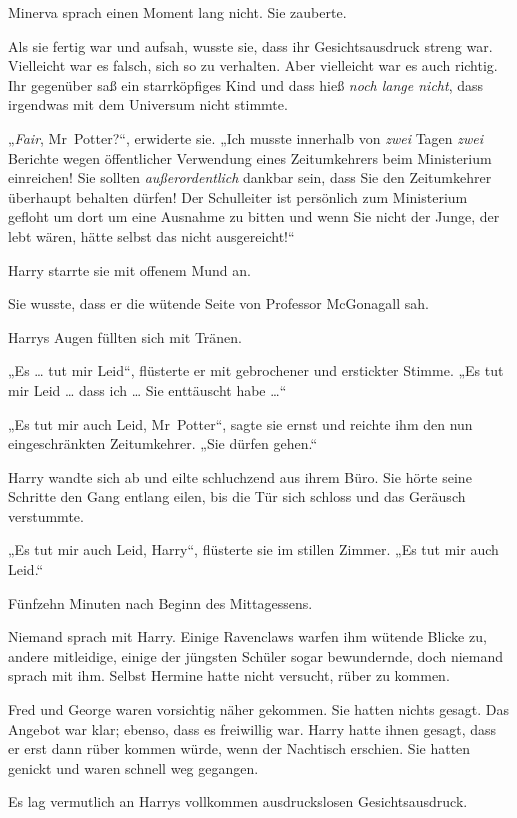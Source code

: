 Minerva sprach einen Moment lang nicht. Sie zauberte. 

Als sie fertig war und aufsah, wusste sie, dass ihr Gesichtsausdruck streng war. Vielleicht war es falsch, sich so zu verhalten. Aber vielleicht war es auch richtig. Ihr gegenüber saß ein starrköpfiges Kind und dass hieß \emph{noch lange nicht}, dass irgendwas mit dem Universum nicht stimmte. 

„\emph{Fair}, Mr~Potter?“, erwiderte sie. „Ich musste innerhalb von \emph{zwei} Tagen \emph{zwei} Berichte wegen öffentlicher Verwendung eines Zeitumkehrers beim Ministerium einreichen! Sie sollten \emph{außerordentlich} dankbar sein, dass Sie den Zeitumkehrer überhaupt behalten dürfen! Der Schulleiter ist persönlich zum Ministerium gefloht um dort um eine Ausnahme zu bitten und wenn Sie nicht der Junge, der lebt wären, hätte selbst das nicht ausgereicht!“ 

Harry starrte sie mit offenem Mund an. 

Sie wusste, dass er die wütende Seite von Professor McGonagall sah. 

Harrys Augen füllten sich mit Tränen. 

„Es … tut mir Leid“, flüsterte er mit gebrochener und erstickter Stimme. „Es tut mir Leid … dass ich … Sie enttäuscht habe …“ 

„Es tut mir auch Leid, Mr~Potter“, sagte sie ernst und reichte ihm den nun eingeschränkten Zeitumkehrer. „Sie dürfen gehen.“ 

Harry wandte sich ab und eilte schluchzend aus ihrem Büro. Sie hörte seine Schritte den Gang entlang eilen, bis die Tür sich schloss und das Geräusch verstummte. 

„Es tut mir auch Leid, Harry“, flüsterte sie im stillen Zimmer. „Es tut mir auch Leid.“ 

\later 

Fünfzehn Minuten nach Beginn des Mittagessens. 

Niemand sprach mit Harry. Einige Ravenclaws warfen ihm wütende Blicke zu, andere mitleidige, einige der jüngsten Schüler sogar bewundernde, doch niemand sprach mit ihm. Selbst Hermine hatte nicht versucht, rüber zu kommen. 

Fred und George waren vorsichtig näher gekommen. Sie hatten nichts gesagt. Das Angebot war klar; ebenso, dass es freiwillig war. Harry hatte ihnen gesagt, dass er erst dann rüber kommen würde, wenn der Nachtisch erschien. Sie hatten genickt und waren schnell weg gegangen. 

Es lag vermutlich an Harrys vollkommen ausdruckslosen Gesichtsausdruck. 

